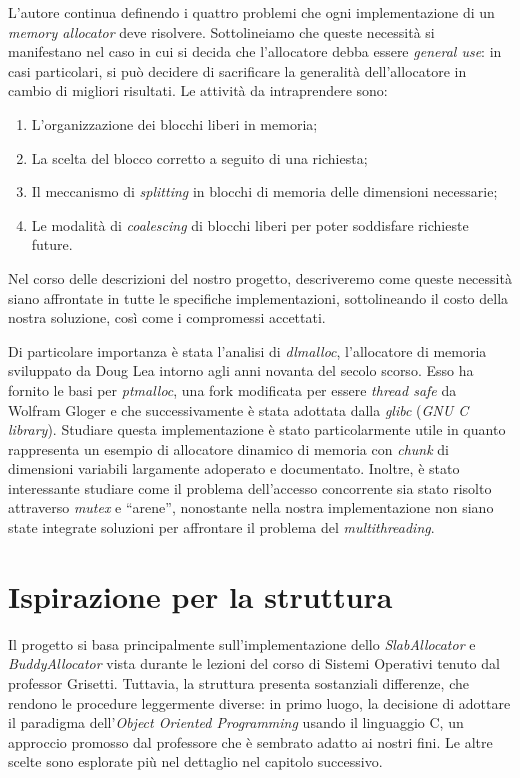 L’autore continua definendo i quattro problemi che ogni implementazione di un \textit{memory allocator} deve risolvere. Sottolineiamo che queste necessità si manifestano nel caso in cui si decida che l’allocatore debba essere \textit{general use}: in casi particolari, si può decidere di sacrificare la generalità dell’allocatore in cambio di migliori risultati\footnotemark. Le attività da intraprendere sono:
\begin{enumerate}
  \item L’organizzazione dei blocchi liberi in memoria;
  \item La scelta del blocco corretto a seguito di una richiesta;
  \item Il meccanismo di \textit{splitting} in blocchi di memoria delle dimensioni necessarie;
  \item Le modalità di \textit{coalescing} di blocchi liberi per poter soddisfare richieste future.
\end{enumerate}
Nel corso delle descrizioni del nostro progetto, descriveremo come queste necessità siano affrontate in tutte le specifiche implementazioni, sottolineando il costo della nostra soluzione, così come i compromessi accettati.


Di particolare importanza è stata l’analisi di \textit{dlmalloc}\cite{dlmalloc}, l’allocatore di memoria sviluppato da Doug Lea intorno agli anni novanta del secolo scorso. Esso ha fornito le basi per \textit{ptmalloc}, una fork modificata per essere \textit{thread safe} da Wolfram Gloger e che successivamente è stata adottata dalla \textit{glibc} (\textit{GNU C library}). Studiare questa implementazione è stato particolarmente utile in quanto rappresenta un esempio di allocatore dinamico di memoria con \textit{chunk} di dimensioni variabili largamente adoperato e documentato. Inoltre, è stato interessante studiare come il problema dell’accesso concorrente sia stato risolto attraverso \textit{mutex} e ``arene'', nonostante nella nostra implementazione non siano state integrate soluzioni per affrontare il problema del \textit{multithreading}.

\section{Ispirazione per la struttura}
Il progetto si basa principalmente sull’implementazione dello \textit{SlabAllocator} e \textit{BuddyAllocator} vista durante le lezioni del corso di Sistemi Operativi tenuto dal professor Grisetti. Tuttavia, la struttura presenta sostanziali differenze, che rendono le procedure leggermente diverse: in primo luogo, la decisione di adottare il paradigma dell'\textit{Object Oriented Programming} usando il linguaggio C, un approccio promosso dal professore che è sembrato adatto ai nostri fini. Le altre scelte sono esplorate più nel dettaglio nel capitolo successivo.

